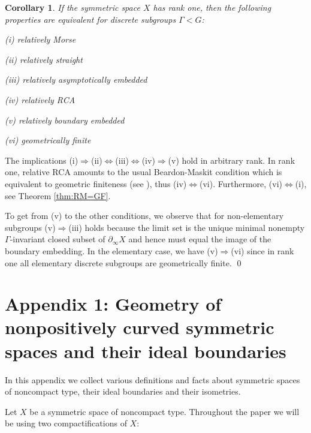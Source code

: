 \documentclass[12pt]{article}
\theoremstyle{boldplain}
\newtheorem{cor}[equation]{Corollary}
\theoremstyle{bolddefinition}
\numberwithin{equation}{section}
\def\Ga{\Gamma}
\def\geo{\partial_{\infty}}
\def\Ra{\Rightarrow}
\begin{document}
\begin{cor}\label{cor:rank1}
If the symmetric space $X$ has rank one,
then the following properties are equivalent for discrete subgroups $\Ga<G$:

(i) relatively Morse

(ii) relatively straight

(iii) relatively asymptotically embedded

(iv) relatively RCA

(v) relatively boundary embedded

(vi) geometrically finite
\end{cor}
\proof The implications (i)$\Ra$(ii)$\Leftrightarrow$(iii)$\Leftrightarrow$(iv)$\Ra$(v) hold in arbitrary rank.
In rank one, relative RCA amounts to the usual Beardon-Maskit
condition which is equivalent to geometric finiteness (see \cite{Bowditch}),
thus (iv)$\Leftrightarrow$(vi). 
Furthermore, (vi)$\Leftrightarrow$(i), see Theorem \ref{thm:RM=GF}. 

To get from (v) to the other conditions,
we observe that for non-elementary subgroups (v)$\Ra$(iii) holds 
because the limit set is the unique minimal nonempty $\Ga$-invariant closed subset of $\geo X$
and hence must equal the image of the boundary embedding. 
In the elementary case, we have (v)$\Ra$(vi) since in rank one 
all elementary discrete subgroups are geometrically finite. 
\qed

\section{Appendix 1: Geometry of nonpositively curved 
symmetric spaces and their ideal boundaries} 


In this appendix we collect various definitions and facts about symmetric spaces of noncompact type, their ideal boundaries and their isometries. 

\medskip 
Let $X$ be a symmetric space of noncompact type. 
Throughout the paper we will be using two compactifications of $X$: 
\end{document}
